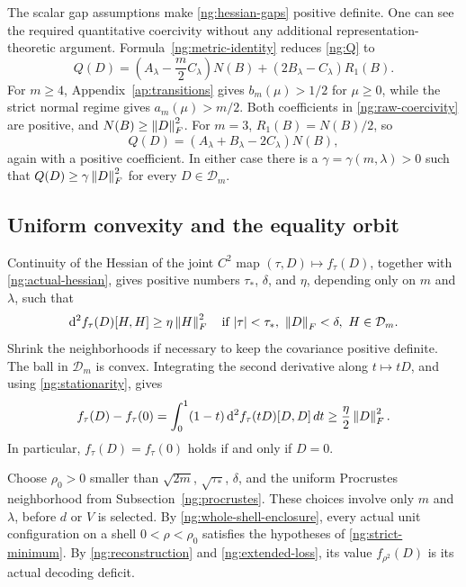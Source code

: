 The scalar gap assumptions make \eqref{ng:hessian-gaps} positive definite.
One can see the required quantitative coercivity without any additional
representation-theoretic argument. Formula~\eqref{ng:metric-identity}
reduces \eqref{ng:Q} to
\begin{equation}\label{ng:raw-coercivity}
 Q(D)=\left(A_\lambda-\frac m2C_\lambda\right)N(B)
                       +(2B_\lambda-C_\lambda)R_1(B).
\end{equation}
For $m\ge4$, Appendix~\ref{ap:transitions} gives
$b_m(\mu)>1/2$ for $\mu\ge0$, while the strict normal regime gives
$a_m(\mu)>m/2$. Both coefficients in \eqref{ng:raw-coercivity}
are positive, and $N(B)\ge\left\lVert D\right\rVert_F^2$.
For $m=3$, $R_1(B)=N(B)/2$, so
\[
 Q(D)=(A_\lambda+B_\lambda-2C_\lambda)N(B),
\]
again with a positive coefficient. In either case there is a
$\gamma=\gamma(m,\lambda)>0$ such that
$Q(D)\ge\gamma\left\lVert D\right\rVert_F^2$ for every $D\in\mathcal D_m$.

\subsection{Uniform convexity and the equality orbit}\label{ng:minimum}

Continuity of the Hessian of the joint $C^2$ map $(\tau,D)\mapsto f_\tau(D)$,
together with \eqref{ng:actual-hessian}, gives positive numbers
$\tau_*$, $\delta$, and $\eta$, depending only on $m$ and $\lambda$, such that
\[
 \mathrm d^2f_\tau(D)[H,H]\ge\eta\left\lVert H\right\rVert_F^2
 \quad\text{if }|\tau|<\tau_*,\ \left\lVert D\right\rVert_F<\delta,\
                       H\in\mathcal D_m.
\]
Shrink the neighborhoods if necessary to keep the covariance positive
definite. The ball in $\mathcal D_m$ is convex. Integrating the second
derivative along $t\mapsto tD$, and using \eqref{ng:stationarity}, gives
\begin{equation}\label{ng:strict-minimum}
 f_\tau(D)-f_\tau(0)
 =\int_0^1(1-t)\,\mathrm d^2 f_\tau(tD)[D,D]\,dt
 \ge\frac\eta2\left\lVert D\right\rVert_F^2.
\end{equation}
In particular, $f_\tau(D)=f_\tau(0)$ holds if and only if $D=0$.

Choose $\rho_0>0$ smaller than $\sqrt{2m}$, $\sqrt{\tau_*}$,
$\delta$, and the uniform Procrustes neighborhood from
Subsection~\ref{ng:procrustes}. These choices involve only $m$ and
$\lambda$, before $d$ or $V$ is selected.
By \eqref{ng:whole-shell-enclosure}, every actual unit configuration on
a shell $0<\rho<\rho_0$ satisfies the hypotheses of
\eqref{ng:strict-minimum}. By \eqref{ng:reconstruction} and
\eqref{ng:extended-loss}, its value $f_{\rho^2}(D)$ is its actual
decoding deficit.

